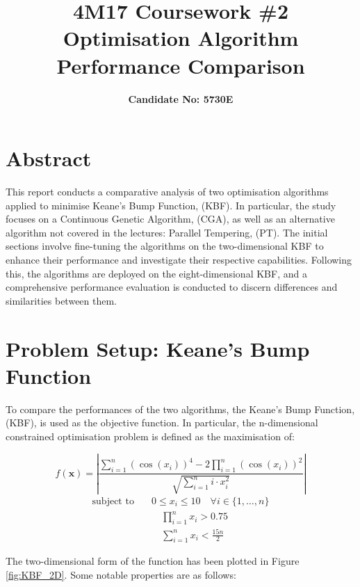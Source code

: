\documentclass[10pt]{article}
\title{\textbf{4M17 Coursework \#2 \\ Optimisation Algorithm Performance Comparison}}
\author{\textbf{Candidate No: 5730E}}
\begin{document}
\vspace{-3cm}
\maketitle
\begin{multicols}{2}
\section{Abstract}
This report conducts a comparative analysis of two optimisation algorithms applied to minimise Keane's Bump Function, (KBF). In particular, the study focuses on a Continuous Genetic Algorithm, (CGA), as well as an alternative algorithm not covered in the lectures: Parallel Tempering, (PT). The initial sections involve fine-tuning the algorithms on the two-dimensional KBF to enhance their performance and investigate their respective capabilities. Following this, the algorithms are deployed on the eight-dimensional KBF, and a comprehensive performance evaluation is conducted to discern differences and similarities between them. 

\section{Problem Setup: Keane's Bump Function}

To compare the performances of the two algorithms, the Keane's Bump Function, (KBF), is used as the objective function. In particular, the n-dimensional constrained optimisation problem is defined as the maximisation of:

\begin{equation}
    f(\mathbf{x}) = \left| \frac{\sum_{i=1}^{n} (\cos(x_i))^4 - 2\prod_{i=1}^{n} (\cos(x_i))^2}{\sqrt{\sum_{i=1}^{n} i \cdot x_i^2}} \right|
    \label{eq:KBF_cost}
\end{equation}
\begin{equation}
    \begin{aligned}
        \text{subject to} \quad & 0 \leq x_i \leq 10 \quad \forall i \in \{1, \dots, n\} \\
        & \quad \prod_{i=1}^{n} x_i > 0.75 \\
        & \quad \sum_{i=1}^{n} x_i < \frac{15n}{2}
    \end{aligned} 
    \label{eq:KBF_constraints}
\end{equation}

The two-dimensional form of the function has been plotted in Figure \ref{fig:KBF_2D}. Some notable properties are as follows:


\end{multicols}
\end{document}
